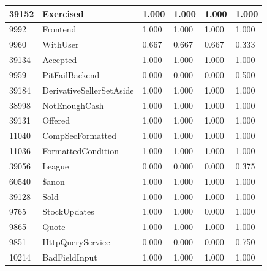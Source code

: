 \documentclass[a4paper]{article}
\newlength{\DUtablewidth} %
\begin{document}
\begin{longtable*}[c]{|p{0.160\DUtablewidth}|p{0.160\DUtablewidth}|p{0.160\DUtablewidth}|p{0.160\DUtablewidth}|p{0.160\DUtablewidth}|p{0.160\DUtablewidth}|}
39152
 & 
Exercised
 & 
1.000
 & 
1.000
 & 
1.000
 & 
1.000
 \\
\hline

9992
 & 
Frontend
 & 
1.000
 & 
1.000
 & 
1.000
 & 
1.000
 \\
\hline

9960
 & 
WithUser
 & 
0.667
 & 
0.667
 & 
0.667
 & 
0.333
 \\
\hline

39134
 & 
Accepted
 & 
1.000
 & 
1.000
 & 
1.000
 & 
1.000
 \\
\hline

9959
 & 
PitFailBackend
 & 
0.000
 & 
0.000
 & 
0.000
 & 
0.500
 \\
\hline

39184
 & 
DerivativeSellerSetAside
 & 
1.000
 & 
1.000
 & 
1.000
 & 
1.000
 \\
\hline

38998
 & 
NotEnoughCash
 & 
1.000
 & 
1.000
 & 
1.000
 & 
1.000
 \\
\hline

39131
 & 
Offered
 & 
1.000
 & 
1.000
 & 
1.000
 & 
1.000
 \\
\hline

11040
 & 
CompSecFormatted
 & 
1.000
 & 
1.000
 & 
1.000
 & 
1.000
 \\
\hline

11036
 & 
FormattedCondition
 & 
1.000
 & 
1.000
 & 
1.000
 & 
1.000
 \\
\hline

39056
 & 
League
 & 
0.000
 & 
0.000
 & 
0.000
 & 
0.375
 \\
\hline

60540
 & 
\$anon
 & 
1.000
 & 
1.000
 & 
1.000
 & 
1.000
 \\
\hline

39128
 & 
Sold
 & 
1.000
 & 
1.000
 & 
1.000
 & 
1.000
 \\
\hline

9765
 & 
StockUpdates
 & 
1.000
 & 
1.000
 & 
0.000
 & 
1.000
 \\
\hline

9865
 & 
Quote
 & 
1.000
 & 
1.000
 & 
1.000
 & 
1.000
 \\
\hline

9851
 & 
HttpQueryService
 & 
0.000
 & 
0.000
 & 
0.000
 & 
0.750
 \\
\hline

10214
 & 
BadFieldInput
 & 
1.000
 & 
1.000
 & 
1.000
 & 
1.000
 \\
\hline


\end{longtable*}
\end{document}
